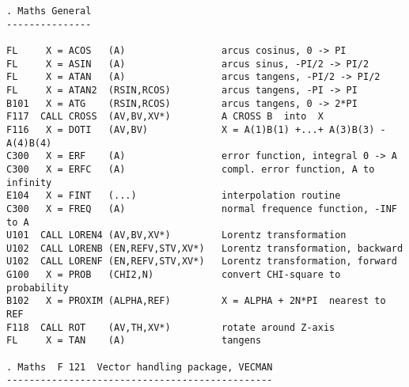 \begin{verbatim}
. Maths General
---------------

FL     X = ACOS   (A)                 arcus cosinus, 0 -> PI
FL     X = ASIN   (A)                 arcus sinus, -PI/2 -> PI/2
FL     X = ATAN   (A)                 arcus tangens, -PI/2 -> PI/2
FL     X = ATAN2  (RSIN,RCOS)         arcus tangens, -PI -> PI
B101   X = ATG    (RSIN,RCOS)         arcus tangens, 0 -> 2*PI
F117  CALL CROSS  (AV,BV,XV*)         A CROSS B  into  X
F116   X = DOTI   (AV,BV)             X = A(1)B(1) +...+ A(3)B(3) - A(4)B(4)
C300   X = ERF    (A)                 error function, integral 0 -> A
C300   X = ERFC   (A)                 compl. error function, A to infinity
E104   X = FINT   (...)               interpolation routine
C300   X = FREQ   (A)                 normal frequence function, -INF to A
U101  CALL LOREN4 (AV,BV,XV*)         Lorentz transformation
U102  CALL LORENB (EN,REFV,STV,XV*)   Lorentz transformation, backward
U102  CALL LORENF (EN,REFV,STV,XV*)   Lorentz transformation, forward
G100   X = PROB   (CHI2,N)            convert CHI-square to probability
B102   X = PROXIM (ALPHA,REF)         X = ALPHA + 2N*PI  nearest to REF
F118  CALL ROT    (AV,TH,XV*)         rotate around Z-axis
FL     X = TAN    (A)                 tangens

. Maths  F 121  Vector handling package, VECMAN
-----------------------------------------------


\end{verbatim}
